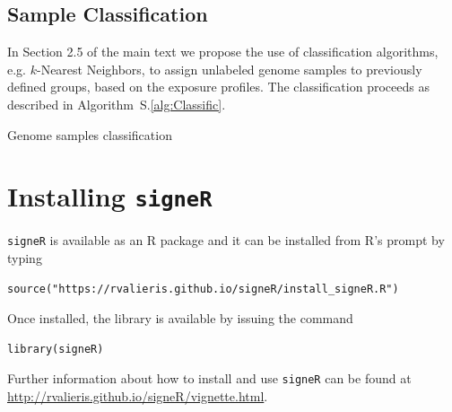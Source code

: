 \documentclass[11pt]{amsart}
\makeatletter
\def\BState{\State\hskip-\ALG@thistlm}
\theoremstyle{definition}
\makeatother
\begin{document}
\subsection{Sample Classification}
In Section 2.5 of the main text we propose the use of classification
algorithms, e.g. $k$-Nearest Neighbors, to assign unlabeled genome
samples to previously defined groups, based on the exposure profiles.
The classification proceeds as described in
Algorithm~S.\ref{alg:Classific}.

\begin{algorithm}
\caption{Genome samples classification}\label{alg:Classific}
\end{algorithm}


\section{Installing \texttt{signeR}}
\texttt{signeR} is available as an R package and it can be installed
from R's prompt by typing
\begin{lstlisting}[]
   source("https://rvalieris.github.io/signeR/install_signeR.R")
\end{lstlisting}
Once installed, the library is available by issuing the command
\begin{lstlisting}[]
   library(signeR)
\end{lstlisting}
Further information about how to install and use \texttt{signeR} can
be found at\\
\indent\indent\url{http://rvalieris.github.io/signeR/vignette.html}.
\\
\end{document}
